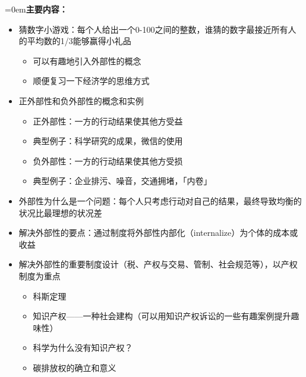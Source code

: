 \documentclass[10pt,a4paper]{ctexart}
\newcommand{\field}[1]{\par\noindent\hangindent=0em\textbf{#1}\hspace{0.2em}}
\begin{document}
\field{主要内容：}
\begin{itemize}
  \item 猜数字小游戏：每个人给出一个0-100之间的整数，谁猜的数字最接近所有人的平均数的1/3能够赢得小礼品
  \begin{itemize}
    \item 可以有趣地引入外部性的概念
    \item 顺便复习一下经济学的思维方式
  \end{itemize}
  \item 正外部性和负外部性的概念和实例
  \begin{itemize}
    \item 正外部性：一方的行动结果使其他方受益
    \item 典型例子：科学研究的成果，微信的使用
    \item 负外部性：一方的行动结果使其他方受损
    \item 典型例子：企业排污、噪音，交通拥堵，「内卷」
  \end{itemize}
  \item 外部性为什么是一个问题：每个人只考虑行动对自己的结果，最终导致均衡的状况比最理想的状况差
  \item 解决外部性的要点：通过制度将外部性内部化（internalize）为个体的成本或收益
  \item 解决外部性的重要制度设计（税、产权与交易、管制、社会规范等），以产权制度为重点
  \begin{itemize}
    \item 科斯定理
    \item 知识产权——一种社会建构（可以用知识产权诉讼的一些有趣案例提升趣味性）
    \item 科学为什么没有知识产权？
    \item 碳排放权的确立和意义
  \end{itemize}
\end{itemize}
\end{document}
